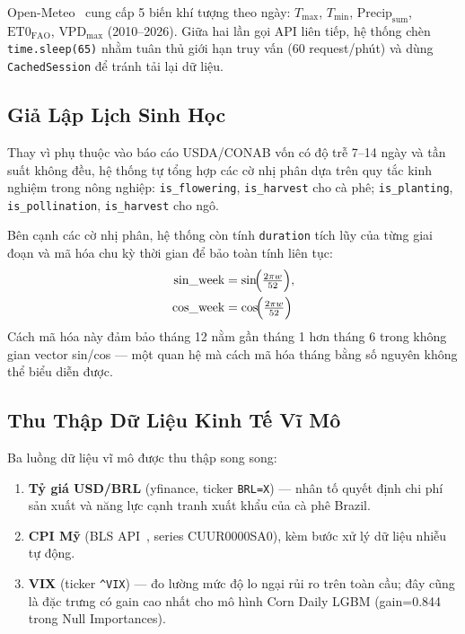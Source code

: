 \documentclass[conference]{IEEEtran}
\begin{document}
Open-Meteo~\cite{zippenfenig2023} cung cấp 5 biến khí tượng theo ngày:
$T_{\max}$, $T_{\min}$, $\text{Precip}_\text{sum}$, $\text{ET0}_\text{FAO}$,
$\text{VPD}_{\max}$ (2010--2026). Giữa hai lần gọi API liên tiếp, hệ thống
chèn \texttt{time.sleep(65)} nhằm tuân thủ giới hạn truy vấn (60 request/phút)
và dùng \texttt{CachedSession} để tránh tải lại dữ liệu.

\subsection{Giả Lập Lịch Sinh Học}

Thay vì phụ thuộc vào báo cáo USDA/CONAB vốn có độ trễ 7--14 ngày và tần suất
không đều, hệ thống tự tổng hợp các cờ nhị phân dựa trên quy tắc kinh nghiệm
trong nông nghiệp: \texttt{is\_flowering}, \texttt{is\_harvest} cho cà phê;
\texttt{is\_planting}, \texttt{is\_pollination}, \texttt{is\_harvest} cho ngô.

Bên cạnh các cờ nhị phân, hệ thống còn tính \texttt{duration} tích lũy của
từng giai đoạn và mã hóa chu kỳ thời gian để bảo toàn tính liên tục:
\begin{equation}
\begin{aligned}
\text{sin\_week} &= \sin\!\Bigl(\tfrac{2\pi w}{52}\Bigr), \\
\text{cos\_week} &= \cos\!\Bigl(\tfrac{2\pi w}{52}\Bigr)
\end{aligned}
\label{eq:cyclic}
\end{equation}
Cách mã hóa này đảm bảo tháng 12 nằm gần tháng 1 hơn tháng 6 trong không gian
vector sin/cos --- một quan hệ mà cách mã hóa tháng bằng số nguyên không thể
biểu diễn được.

\subsection{Thu Thập Dữ Liệu Kinh Tế Vĩ Mô}

Ba luồng dữ liệu vĩ mô được thu thập song song:

\begin{enumerate}
\item \textbf{Tỷ giá USD/BRL} (yfinance, ticker \texttt{BRL=X}) --- nhân tố
  quyết định chi phí sản xuất và năng lực cạnh tranh xuất khẩu của cà phê
  Brazil.
\item \textbf{CPI Mỹ} (BLS API~\cite{bls2026}, series CUUR0000SA0), kèm bước
  xử lý dữ liệu nhiễu tự động.
\item \textbf{VIX} (ticker \texttt{\^{}VIX}) --- đo lường mức độ lo ngại rủi
  ro trên toàn cầu; đây cũng là đặc trưng có gain cao nhất cho mô hình Corn
  Daily LGBM (gain=0.844 trong Null Importances).
\end{enumerate}
\end{document}
